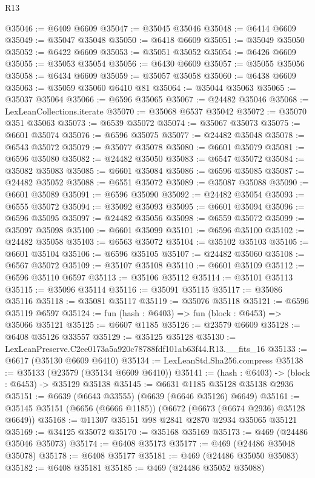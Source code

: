 \begin{lexlean}{R13}
\begin{coremodule}
@35046 := @6409 @6609
@35047 := @35045 @35046
@35048 := @6414 @6609
@35049 := @35047 @35048
@35050 := @6418 @6609
@35051 := @35049 @35050
@35052 := @6422 @6609
@35053 := @35051 @35052
@35054 := @6426 @6609
@35055 := @35053 @35054
@35056 := @6430 @6609
@35057 := @35055 @35056
@35058 := @6434 @6609
@35059 := @35057 @35058
@35060 := @6438 @6609
@35063 := @35059 @35060 @6410 @81
@35064 := @35044 @35063
@35065 := @35037 @35064
@35066 := @6596 @35065
@35067 := @24482 @35046
@35068 := LexLeanCollections.iterate
@35070 := @35068 @6537 @35042
@35072 := @35070 @351 @35063
@35073 := @6539 @35072
@35074 := @35067 @35073
@35075 := @6601 @35074
@35076 := @6596 @35075
@35077 := @24482 @35048
@35078 := @6543 @35072
@35079 := @35077 @35078
@35080 := @6601 @35079
@35081 := @6596 @35080
@35082 := @24482 @35050
@35083 := @6547 @35072
@35084 := @35082 @35083
@35085 := @6601 @35084
@35086 := @6596 @35085
@35087 := @24482 @35052
@35088 := @6551 @35072
@35089 := @35087 @35088
@35090 := @6601 @35089
@35091 := @6596 @35090
@35092 := @24482 @35054
@35093 := @6555 @35072
@35094 := @35092 @35093
@35095 := @6601 @35094
@35096 := @6596 @35095
@35097 := @24482 @35056
@35098 := @6559 @35072
@35099 := @35097 @35098
@35100 := @6601 @35099
@35101 := @6596 @35100
@35102 := @24482 @35058
@35103 := @6563 @35072
@35104 := @35102 @35103
@35105 := @6601 @35104
@35106 := @6596 @35105
@35107 := @24482 @35060
@35108 := @6567 @35072
@35109 := @35107 @35108
@35110 := @6601 @35109
@35112 := @6596 @35110 @6597
@35113 := @35106 @35112
@35114 := @35101 @35113
@35115 := @35096 @35114
@35116 := @35091 @35115
@35117 := @35086 @35116
@35118 := @35081 @35117
@35119 := @35076 @35118
@35121 := @6596 @35119 @6597
@35124 := fun (hash : @6403) => fun (block : @6453) => @35066 @35121
@35125 := @6607 @1185
@35126 := @23579 @6609
@35128 := @6408 @35126 @33557
@35129 := @35125 @35128
@35130 := LexLeanPreserve.C2ee0173a5a920c78788fdf101ab63f44.R13.__fits_16
@35133 := @6617 (@35130 @6609 @6410)
@35134 := LexLeanStd.Sha256.compress
@35138 := @35133 (@23579 (@35134 @6609 @6410))
@35141 := (hash : @6403) -> (block : @6453) -> @35129 @35138
@35145 := @6631 @1185 @35128 @35138 @2936
@35151 := @6639 (@6643 @33555) (@6639 (@6646 @35126) @6649)
@35161 := @35145 @35151 (@6656 (@6666 @1185)) (@6672 (@6673 (@6674 @2936) @35128 @6649))
@35168 := @11307 @35151 @98 @2841 @2870 @2934 @35065 @35121
@35169 := @34125 @35072
@35170 := @35168 @35169
@35173 := @469 (@24486 @35046 @35073)
@35174 := @6408 @35173
@35177 := @469 (@24486 @35048 @35078)
@35178 := @6408 @35177
@35181 := @469 (@24486 @35050 @35083)
@35182 := @6408 @35181
@35185 := @469 (@24486 @35052 @35088)

\end{coremodule}
\end{lexlean}
